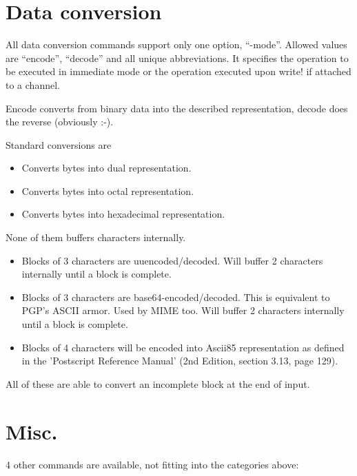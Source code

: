 \section {Data conversion}

All data conversion commands support only one option, ``-mode''.
Allowed values are ``encode'', ``decode'' and all unique
abbreviations. It specifies the operation to be executed in immediate
mode or the operation executed upon write! if attached to a channel.

Encode converts from binary data into the described representation,
decode does the reverse (obviously :-).

Standard conversions are
\begin {itemize}
\item[bin]	Converts bytes into dual representation.
\item[oct]	Converts bytes into octal representation.
\item[hex]	Converts bytes into hexadecimal representation.
\end   {itemize}
None of them buffers characters internally.

\begin {itemize}
\item[uuencode]	Blocks of 3 characters are uuencoded/decoded. Will
		buffer 2 characters internally until a block is complete.
\item[base64]	Blocks of 3 characters are
		base64-encoded/decoded. This is equivalent to PGP's
		ASCII armor. Used by MIME too. Will buffer 2
		characters internally until a block is complete.
\item[ascii85]	Blocks of 4 characters will be encoded into Ascii85
		representation as defined in the 'Postscript Reference
		Manual' (2nd Edition, section 3.13, page 129).
\end   {itemize}
All of these are able to convert an incomplete block at the end of
input.

\section {Misc.}

4 other commands are available, not fitting into the categories above:

